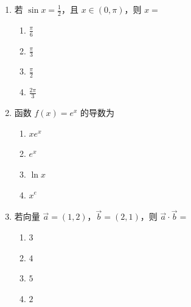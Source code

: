 \documentclass[UTF8,a4paper]{ctexart}
\begin{document}
\begin{enumerate}[leftmargin=2em,itemsep=0.8em]
\begin{enumerate}[label=\Alph*.,itemsep=0.2em,parsep=0pt]
\item $12$

\item $10$

\end{enumerate}




\item 若 $\sin x=\frac{1}{2}$，且 $x\in(0,\pi)$，则 $x=$

\begin{enumerate}[label=\Alph*.,itemsep=0.2em,parsep=0pt]

\item $\frac{\pi}{6}$

\item $\frac{\pi}{3}$

\item $\frac{\pi}{2}$

\item $\frac{2\pi}{3}$

\end{enumerate}




\item 函数 $f(x)=e^x$ 的导数为

\begin{enumerate}[label=\Alph*.,itemsep=0.2em,parsep=0pt]

\item $xe^x$

\item $e^x$

\item $\ln x$

\item $x^{e}$

\end{enumerate}




\item 若向量 $\vec a=(1,2)$，$\vec b=(2,1)$，则 $\vec a \cdot \vec b=$

\begin{enumerate}[label=\Alph*.,itemsep=0.2em,parsep=0pt]

\item $3$

\item $4$

\item $5$

\item $2$

\end{enumerate}





\end{enumerate}
\end{document}
